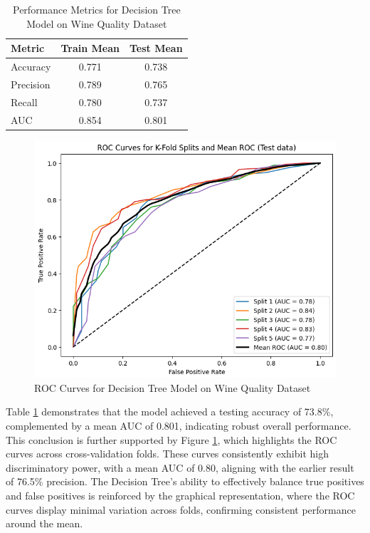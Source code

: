 \documentclass[conference]{IEEEtran}
\begin{document}
\begin{table}[h]
\centering
\caption{Performance Metrics for Decision Tree Model on Wine Quality Dataset}
\label{tab:dt_wine}
\begin{tabular}{|l|c|c|}
\hline
\textbf{Metric} & \textbf{Train Mean} & \textbf{Test Mean} \\
\hline
Accuracy & 0.771 & 0.738 \\
\hline
Precision & 0.789 & 0.765 \\
\hline
Recall & 0.780 & 0.737 \\
\hline
AUC & 0.854 & 0.801 \\
\hline
\end{tabular}
\end{table}

\begin{figure}[h] \centering \includegraphics[width=\columnwidth]{plots/dt_wine_ROC_curves.png} \caption{ROC Curves for Decision Tree Model on Wine Quality Dataset} \label{fig:dt_roc_wine} \end{figure}

Table \ref{tab:dt_wine} demonstrates that the model achieved a testing accuracy of 73.8\%, complemented by a mean AUC of 0.801, indicating robust overall performance. This conclusion is further supported by Figure \ref{fig:dt_roc_wine}, which highlights the ROC curves across cross-validation folds. These curves consistently exhibit high discriminatory power, with a mean AUC of 0.80, aligning with the earlier result of 76.5\% precision. The Decision Tree's ability to effectively balance true positives and false positives is reinforced by the graphical representation, where the ROC curves display minimal variation across folds, confirming consistent performance around the mean.
\end{document}
